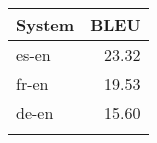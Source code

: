 \begin{tabular}{lr}

\toprule
System & BLEU \\
\toprule
es-en & 23.32 \\
fr-en & 19.53 \\
de-en & 15.60 \\
\bottomrule
\centering
\small
\label{table:eparl100}
\end{tabular}